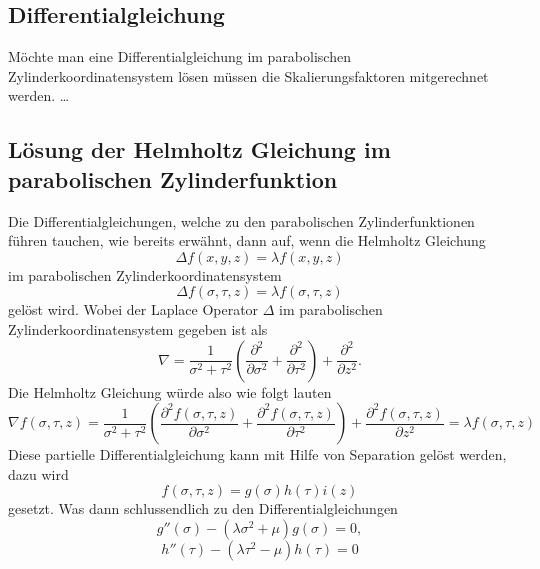 \subsection{Differentialgleichung}
Möchte man eine Differentialgleichung im parabolischen 
Zylinderkoordinatensystem lösen müssen die Skalierungsfaktoren
mitgerechnet werden. 
\dots
\subsection{Lösung der Helmholtz Gleichung im parabolischen Zylinderfunktion}
Die Differentialgleichungen, welche zu den parabolischen Zylinderfunktionen führen tauchen, wie bereits erwähnt, dann auf, wenn die Helmholtz Gleichung
\begin{equation}
	\Delta f(x,y,z) = \lambda f(x,y,z) 
\end{equation}
im parabolischen Zylinderkoordinatensystem
\begin{equation}
	\Delta f(\sigma,\tau,z) = \lambda f(\sigma,\tau,z) 
\end{equation}
gelöst wird.
Wobei der Laplace Operator $\Delta$ im parabolischen Zylinderkoordinatensystem gegeben ist als
\begin{equation}
	\nabla 
	= 
	\frac{1}{\sigma^2 + \tau^2}
	\left ( 
	\frac{\partial^2}{\partial \sigma^2} 
	+ 
	\frac{\partial^2}{\partial \tau^2}
	\right )
	+ 
	\frac{\partial^2}{\partial z^2}.
\end{equation}
Die Helmholtz Gleichung würde also wie folgt lauten
\begin{equation}
	\nabla f(\sigma, \tau, z)
	=
	\frac{1}{\sigma^2 + \tau^2}
	\left ( 
	\frac{\partial^2 f(\sigma,\tau,z)}{\partial \sigma^2} 
	+ 
	\frac{\partial^2 f(\sigma,\tau,z)}{\partial \tau^2}
	\right )
	+ 
	\frac{\partial^2 f(\sigma,\tau,z)}{\partial z^2}
	= 
	\lambda f(\sigma,\tau,z)
\end{equation}
Diese partielle Differentialgleichung kann mit Hilfe von Separation gelöst werden, dazu wird 
\begin{equation}
	f(\sigma,\tau,z) = g(\sigma)h(\tau)i(z)
\end{equation}
gesetzt. 
Was dann schlussendlich zu den Differentialgleichungen 
\begin{equation}\label{parzyl_sep_dgl_1}
	g''(\sigma) 
	- 
	\left (
	\lambda\sigma^2
	+
	\mu 
	\right )
	g(\sigma)
	=
	0,
\end{equation}
\begin{equation}\label{parzyl_sep_dgl_2}
	h''(\tau) 
	- 
	\left (
	\lambda\tau^2
	-
	\mu 
	\right )
	h(\tau)
	=
	0
\end{equation}
